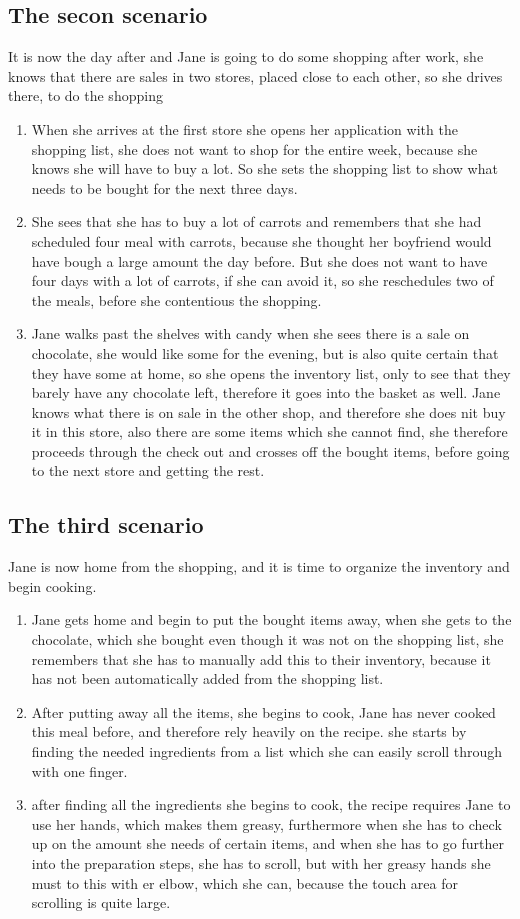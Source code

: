 \subsection{The secon scenario}
It is now the day after and Jane is going to do some shopping after work, she knows that there are sales in two stores, placed close to each other, so she drives there, to do the shopping
\begin{enumerate}
  \item When she arrives at the first store she opens her application with the shopping list, she does not want to shop for the entire week, because she knows she will have to buy a lot. So she sets the shopping list to show what needs to be bought for the next three days.
  \item She sees that she has to buy a lot of carrots and remembers that she had scheduled four meal with carrots, because she thought her boyfriend would have bough a large amount the day before. But she does not want to have four days with a lot of carrots, if she can avoid it, so she reschedules two of the meals, before she contentious the shopping.
  \item Jane walks past the shelves with candy when she sees there is a sale on chocolate, she would like some for the evening, but is also quite certain that they have some at home, so she opens the inventory list, only to see that they barely have any chocolate left, therefore it goes into the basket as well.
  \Item Jane knows what there is on sale in the other shop, and therefore she does nit buy it in this store, also there are some items which she cannot find, she therefore proceeds through the check out and crosses off the bought items, before going to the next store and getting the rest.
\end{enumerate}

\subsection{The third scenario}
Jane is now home from the shopping, and it is time to organize the inventory and begin cooking.
\begin{enumerate}
  \item Jane gets home and begin to put the bought items away, when she gets to the chocolate, which she bought even though it was not on the shopping list, she remembers that she has to manually add this to their inventory, because it has not been automatically added from the shopping list.
  \item After putting away all the items, she begins to cook, Jane has never cooked this meal before, and therefore rely heavily on the recipe. she starts by finding the needed ingredients from a list which she can easily scroll through with one finger.
  \item after finding all the ingredients she begins to cook, the recipe requires Jane to use her hands, which makes them greasy, furthermore when she has to check up on the amount she needs of certain items, and when she has to go further into the preparation steps, she has to scroll, but with her greasy hands she must to this with er elbow, which she can, because the touch area for scrolling is quite large. 
\end{enumerate}